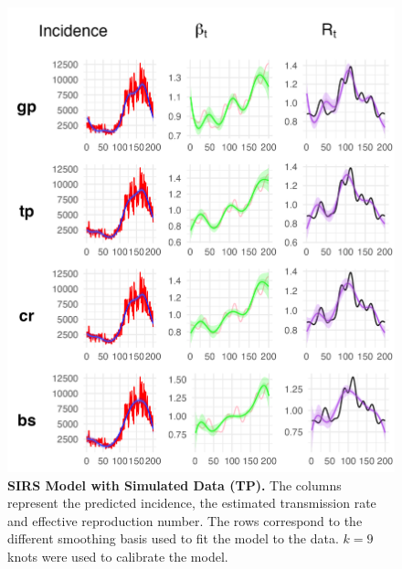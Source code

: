 \documentclass[
11pt, %
oneside, %
english, %
singlespacing, %
]{macthesis} %
\begin{document}
\begin{figure}[H]
\centering
\includegraphics[width=\textwidth]{figure/Simulated/unaggregated/sim_combined_tp_k8.png}
\caption[SIRS model with simulated data (TP).]{\textbf{SIRS Model with Simulated Data (TP).} The columns represent the predicted incidence, the estimated transmission rate and effective reproduction number. The rows correspond to the different smoothing basis used to fit the model to the data. \(k=9\) knots were used to calibrate the model.}
\label{fig:sim_tp}
\end{figure}
\end{document}
